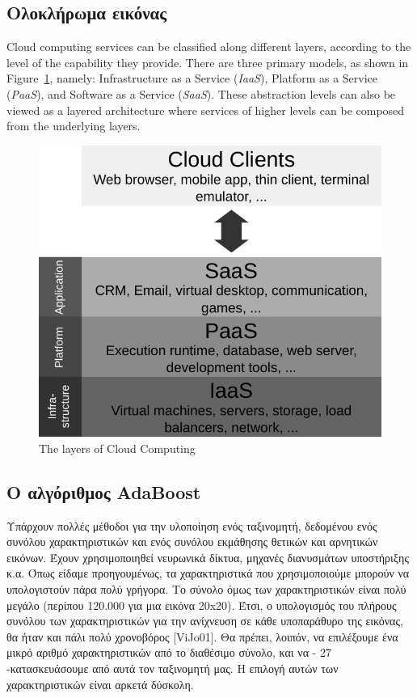 \subsection{Ολοκλήρωμα εικόνας}

Cloud computing services can be classified along different layers, according to
the level of the capability they provide. There are three primary models, as
shown in Figure~\ref{fig:cloud_layers}, namely: Infrastructure as a Service
(\emph{IaaS}), Platform as a Service (\emph{PaaS}), and Software as a Service
(\emph{SaaS}). These abstraction levels can also be viewed as a layered
architecture where services of higher levels can be composed from the underlying
layers.

\begin{figure}[htbp]
  \begin{center}
    \includegraphics[width=1.0\maxwidth]{../figures/cloud_layers-black.pdf}
    \caption{The layers of Cloud Computing\label{fig:cloud_layers}}
   \end{center}
\end{figure}


\subsection{Ο αλγόριθμος AdaBoost}

Υπάρχουν πολλές μέθοδοι για την υλοποίηση ενός ταξινομητή, δεδομένου ενός συνόλου
χαρακτηριστικών και ενός συνόλου εκμάθησης θετικών και αρνητικών εικόνων. Έχουν
χρησιμοποιηθεί νευρωνικά δίκτυα, μηχανές διανυσμάτων υποστήριξης κ.α. Όπως είδαμε
προηγουμένως, τα χαρακτηριστικά που χρησιμοποιούμε μπορούν να υπολογιστούν πάρα πολύ
γρήγορα. Το σύνολο όμως των χαρακτηριστικών είναι πολύ μεγάλο (περίπου 120.000 για μια
εικόνα 20x20). Έτσι, ο υπολογισμός του πλήρους συνόλου των χαρακτηριστικών για την ανίχνευση
σε κάθε υποπαράθυρο της εικόνας, θα ήταν και πάλι πολύ χρονοβόρος [ViJo01]. Θα πρέπει,
λοιπόν, να επιλέξουμε ένα μικρό αριθμό χαρακτηριστικών από το διαθέσιμο σύνολο, και να
- 27 -κατασκευάσουμε από αυτά τον ταξινομητή μας. Η επιλογή αυτών των χαρακτηριστικών είναι
αρκετά δύσκολη.

